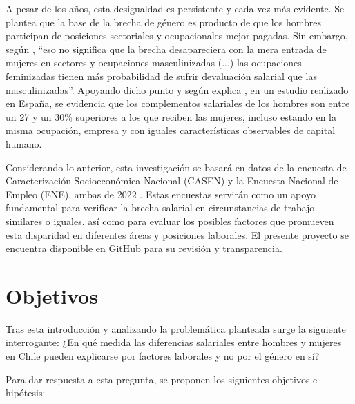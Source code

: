 
A pesar de los años, esta desigualdad es persistente y cada vez más evidente. Se plantea que la base de la brecha de género es producto de que los hombres participan de posiciones sectoriales y ocupacionales mejor pagadas. Sin embargo, según \citet[pp. 333]{Ibanez2022}, ``eso no significa que la brecha desapareciera con la mera entrada de mujeres en sectores y ocupaciones masculinizadas (...) las ocupaciones feminizadas tienen más probabilidad de sufrir devaluación salarial que las masculinizadas''. Apoyando dicho punto y según explica \citet{Villar2010}, en un estudio realizado en España, se evidencia que los complementos salariales de los hombres son entre un 27 y un 30\% superiores a los que reciben las mujeres, incluso estando en la misma ocupación, empresa y con iguales características observables de capital humano.

Considerando lo anterior, esta investigación se basará en datos de la encuesta de Caracterización Socioeconómica Nacional (CASEN) y la Encuesta Nacional de Empleo (ENE), ambas de 2022 \citep{CASEN2022, ENE2022}. Estas encuestas servirán como un apoyo fundamental para verificar la brecha salarial en circunstancias de trabajo similares o iguales, así como para evaluar los posibles factores que promueven esta disparidad en diferentes áreas y posiciones laborales. El presente proyecto se encuentra disponible en \href{https://github.com/ElK1000o/Taller-Ciencia-de-Datos-II/tree/main/Proyecto}{GitHub} para su revisión y transparencia.

\section{Objetivos}


Tras esta introducción y analizando la problemática planteada surge la siguiente interrogante: ¿En qué medida las diferencias salariales entre hombres y mujeres en Chile pueden explicarse por factores laborales y no por el género en sí?

Para dar respuesta a esta pregunta, se proponen los siguientes objetivos e hipótesis:


